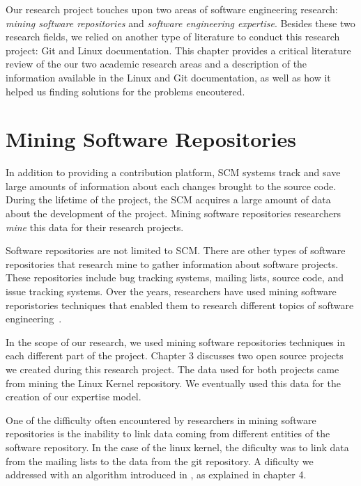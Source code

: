 \label{sec:RevLitt}


Our research project touches upon two areas of software engineering research: \textit{mining software repositories} and \textit{software engineering expertise}. Besides these two research fields, we relied on another type of literature to conduct this research project: Git and Linux documentation. This chapter provides a critical literature review of the our two academic research areas and a description of the information available in the Linux and Git documentation, as well as how it helped us finding solutions for the problems encoutered.



\section{Mining Software Repositories}

In addition to providing a contribution platform, \ac{SCM} systems track and save large amounts of information about each changes brought to the source code. During the lifetime of the project, the \ac{SCM} acquires a large amount of data about the development of the project. Mining software repositories researchers \textit{mine} this data for their research projects. 

Software repositories are not limited to \ac{SCM}. There are other types of software repositories that research mine to gather information about software projects. These repositories include bug tracking systems, mailing lists, source code, and issue tracking systems. Over the years, researchers have used mining software reporistories techniques that enabled them to research different topics of software engineering~\citep{Bird-2009}.

In the scope of our research, we used mining software repositories techniques in each different part of the project. Chapter 3 discusses two open source projects we created during this research project. The data used for both projects came from mining the Linux Kernel repository. We eventually used this data for the creation of our expertise model.

One of the difficulty often encountered by researchers in mining software repositories is the inability to link data coming from different entities of the software repository. In the case of the linux kernel, the dificulty was to link data from the mailing lists to the data from the git repository. A dificulty we addressed with an algorithm introduced in \citep{msr13jojo}, as explained in chapter 4. 

